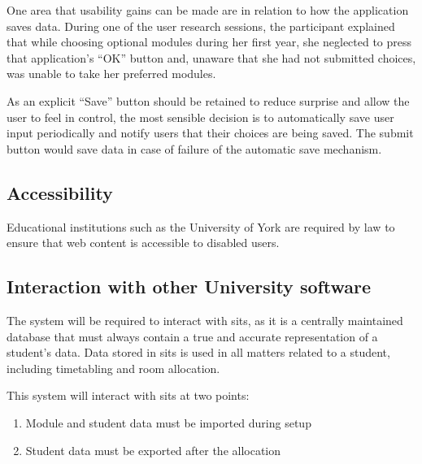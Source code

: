 \documentclass[]{scrartcl}
\begin{document}

One area that usability gains can be made are in relation to how the
application saves data. During one of the user research sessions, the
participant explained that while choosing optional modules during her first
year, she neglected to press that application's ``OK'' button and, unaware
that she had not submitted choices, was unable to take her preferred modules.

As an explicit ``Save'' button should be retained to reduce surprise and allow
the user to feel in control, the most sensible decision is to automatically
save user input periodically and notify users that their choices are being
saved. The submit button would save data in case of failure of the automatic
save mechanism.

\subsection{Accessibility}


Educational institutions such as the University of York are required by law to
ensure that web content is accessible to disabled users.


\subsection{Interaction with other University software}

The system will be required to interact with \gls{sits}, as it is a centrally
maintained database that must always contain a true and accurate
representation of a student's data. Data stored in \gls{sits} is used in all
matters related to a student, including timetabling and room allocation.

This system will interact with \gls{sits} at two points:

\begin{enumerate}
  \item Module and student data must be imported during setup
  \item Student data must be exported after the allocation
\end{enumerate}
\end{document}
